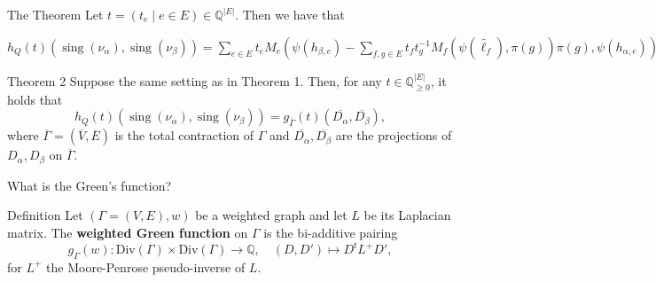 \documentclass{beamer}
\newcommand{\numberset}{\mathbb}
\newcommand{\Q}{\numberset{Q}}
\DeclareMathOperator{\sing}{sing}
\begin{document}
\begin{frame}{The Theorem}
Let $t = (t_e\mid e \in E) \in \Q^{|E|}$. Then we have that

$h_Q(t)(\sing(\nu_\alpha), \sing(\nu_\beta)) = \sum_{e \in E} t_e M_e\left(\psi(h_{\beta,e}) - \sum_{f,g \in E} t_f t_g^{-1} M_f\left(\psi(\widetilde{\ell_f}), \pi(g)\right) \pi(g), \psi(h_{\alpha,e})\right).$
\end{frame}

\begin{frame}{Theorem 2}
Suppose the same setting as in Theorem 1. Then, for any $t \in \Q^{|E|}_{\ge 0}$, it holds that \begin{equation*}\label{eq: ahp equal Green}
h_Q(t)(\sing(\nu_\alpha), \sing(\nu_\beta)) = g_{\overline{\Gamma}}(t)(\overline{D_\alpha}, \overline{D_\beta}),
\end{equation*} where $\overline{\Gamma} = (\overline{V},\overline{E})$ is the total contraction of $\Gamma$ and $\overline{D_\alpha}, \overline{D_\beta}$ are the projections of $D_\alpha,D_\beta$ on $\overline{\Gamma}.$
\end{frame}

\begin{frame}{What is the Green's function?}
\begin{block}{Definition}
	Let $(\Gamma=(V,E), w)$ be a weighted graph and let $L$ be its Laplacian matrix. The \textbf{weighted Green function} on $\Gamma$ is the bi-additive pairing $$g_{\Gamma}(w) \colon \text{Div}(\Gamma) \times \text{Div}(\Gamma) \rightarrow \Q, \quad (D,D') \mapsto D^tL^+ D',$$ for $L^+$ the Moore-Penrose pseudo-inverse of $L$.
\end{block}
\end{frame}
\end{document}
